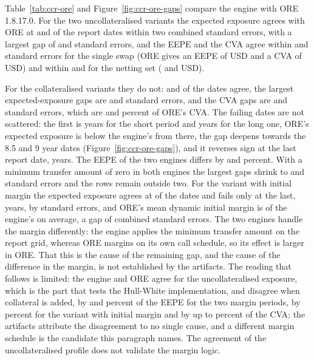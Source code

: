 Table~\ref{tab:ccr-ore} and Figure~\ref{fig:ccr-ore-gaps} compare the engine with ORE 1.8.17.0. For the two uncollateralised variants the expected exposure agrees with ORE at \ccrOreWithinSingle{} and \ccrOreWithinNetting{} of the \ccrOreGridPoints{} report dates within two combined standard errors, with a largest gap of \ccrOreGapSingle{} and \ccrOreGapNetting{} standard errors, and the EEPE and the CVA agree within \ccrOreEepeGapSingle{} and
\ccrOreCvaGapSingle{} standard errors for the single swap (ORE gives an EEPE of \ccrOreEepeSingle{} USD and a CVA of \ccrOreCvaSingle{} USD) and within \ccrOreEepeGapNetting{} and \ccrOreCvaGapNetting{} for the netting set (\ccrOreEepeNetting{} and \ccrOreCvaNetting{} USD).

For the collateralised variants they do not: \ccrOreWithinCsaShort{} and \ccrOreWithinCsaLong{} of the \ccrOreGridPoints{} dates agree, the largest expected-exposure gaps are \ccrOreGapCsaShort{} and \ccrOreGapCsaLong{} standard errors, and the CVA gaps are \ccrOreCvaGapCsaShort{} and \ccrOreCvaGapCsaLong{} standard errors, which are \ccrOreCvaRelCsaShort{} and \ccrOreCvaRelCsaLong{} percent of ORE's CVA. The failing dates are not scattered: the first is \ccrOreFirstFailCsaShort{} years for the short period and \ccrOreFirstFailCsaLong{} years for the long one, ORE's expected exposure is below the engine's from there, the gap deepens towards the 8.5 and 9 year dates (Figure~\ref{fig:ccr-ore-gaps}), and it reverses sign at the last report date, \ccrOreLastFailCsaShort{} years. The EEPE of the
two engines differs by \ccrOreEepeRelCsaShort{} and \ccrOreEepeRelCsaLong{} percent. With a minimum transfer amount of zero in both engines the largest gaps shrink to \ccrMtaZeroGapShort{} and \ccrMtaZeroGapLong{} standard errors and the rows remain outside two. For the variant with initial margin the expected exposure agrees at \ccrOreWithinIm{} of the \ccrOreGridPoints{} dates and fails only at the last, \ccrOreLastFailIm{} years, by \ccrOreGapIm{} standard errors, and ORE's mean dynamic initial margin is \ccrDimRatio{} of the engine's on average, a gap of \ccrDimGap{} combined standard errors. The two engines handle the margin differently: the engine applies the minimum transfer amount on the report grid, whereas ORE margins on its own call schedule, so its effect is larger in ORE. That this is the cause of the remaining gap, and the cause of the difference in the margin, is not
established by the artifacts. The reading that follows is limited: the engine and ORE agree for the uncollateralised exposure, which is the part that tests the Hull-White implementation, and disagree when collateral is added, by \ccrOreEepeRelCsaShort{} and \ccrOreEepeRelCsaLong{} percent of the EEPE for the two margin periods, by \ccrOreEepeRelIm{} percent for the variant with initial margin and by up to \ccrOreCvaRelCsaShort{} percent of the CVA; the artifacts attribute the disagreement to no single cause, and a different margin schedule is the candidate this paragraph names. The agreement of the uncollateralised profile does not
validate the margin logic.

